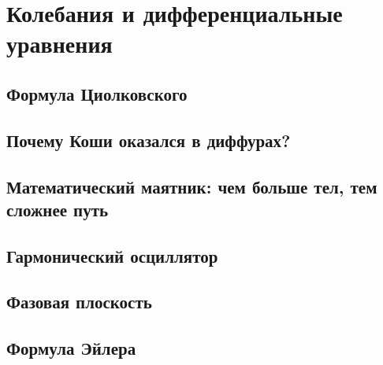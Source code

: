\section{Колебания и дифференциальные уравнения}
\subsection{Формула Циолковского}
\subsection{Почему Коши оказался в диффурах?}
\subsection{Математический маятник: чем больше тел, тем сложнее путь}
\subsection{Гармонический осциллятор}
\subsection{Фазовая плоскость}
\subsection{Формула Эйлера}
